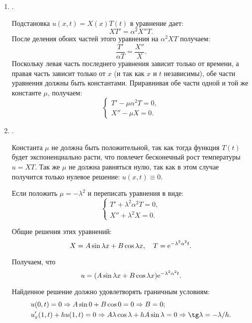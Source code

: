 \begin{enumerate}
    \item {}.
    
    Подстановка \( u(x, t) = X(x)T(t) \) в уравнение дает:
    \[
        XT' = \alpha^2 X''T.
    \]
    После деления обоих частей этого уравнения на \( \alpha^2 XT \) получаем:
    \[
        \frac{T'}{\alpha T} = \frac{X''}{X}.
    \]
    Поскольку левая часть последнего уравнения зависит только от времени, а
    правая часть зависит только от \( x \) (и так как \( x \) и \( t \)
    независимы), обе части уравнения должны быть константами. Приравнивая обе
    части одной и той же константе \( \mu \), получаем:
    \[
        \left\{ \begin{array}{l}
            T' - \mu\alpha^2 T = 0, \\
            X'' - \mu X = 0.
        \end{array} \right.
    \]

    \item {}.
    
    Константа \( \mu \) не должна быть положительной, так как тогда функция
    \( T(t) \) будет экспоненциально расти, что повлечет бесконечный рост
    температуры \( u = XT \). Так же \( \mu \) не должна равняться нулю, так как в этом
    случае получится только нулевое решение: \( u(x, t) \equiv 0 \).
    
    Если положить \( \mu = -\lambda^2 \) и переписать уравнения в виде:
    \[
        \left\{ \begin{array}{l}
            T' + \lambda^2\alpha^2 T = 0, \\
            X'' + \lambda^2 X = 0.
        \end{array} \right.
    \]
    
    Общие решения этих уравнений:
    \[
        X = A\sin\lambda x + B\cos\lambda x, \quad T = \mathrm{e}^{-\lambda^2\alpha^2 t}.
    \]

    Получаем, что
    \[
        u = (A\sin\lambda x + B\cos\lambda x)\mathrm{e}^{-\lambda^2\alpha^2 t}.
    \]

    Найденное решение должно удовлетворять граничным условиям:
    \begin{align*}
        & u(0, t) = 0 \Rightarrow A\sin0 + B\cos0 = 0 \Rightarrow B = 0; \\
        & u'_x(1, t) + hu(1, t) = 0 \Rightarrow A\lambda\cos\lambda +
        hA\sin\lambda = 0 \Rightarrow \tg\lambda = -\lambda/h.
    \end{align*}
    

\end{enumerate}
